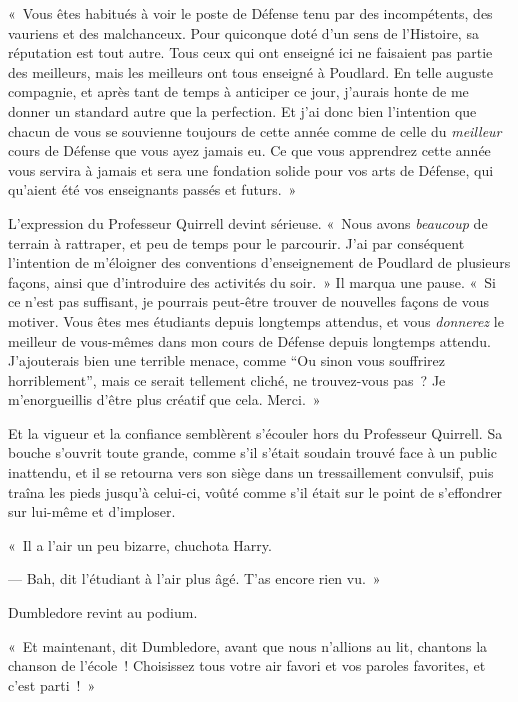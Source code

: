 «~Vous êtes habitués à voir le poste de Défense tenu par des incompétents, des vauriens et des malchanceux. Pour quiconque doté d'un sens de l'Histoire, sa réputation est tout autre. Tous ceux qui ont enseigné ici ne faisaient pas partie des meilleurs, mais les meilleurs ont tous enseigné à Poudlard. En telle auguste compagnie, et après tant de temps à anticiper ce jour, j'aurais honte de me donner un standard autre que la perfection. Et j'ai donc bien l'intention que chacun de vous se souvienne toujours de cette année comme de celle du \emph{meilleur} cours de Défense que vous ayez jamais eu. Ce que vous apprendrez cette année vous servira à jamais et sera une fondation solide pour vos arts de Défense, qui qu'aient été vos enseignants passés et futurs.~»

L'expression du Professeur Quirrell devint sérieuse. «~Nous avons \emph{beaucoup} de terrain à rattraper, et peu de temps pour le parcourir. J'ai par conséquent l'intention de m'éloigner des conventions d'enseignement de Poudlard de plusieurs façons, ainsi que d'introduire des activités du soir.~» Il marqua une pause. «~Si ce n'est pas suffisant, je pourrais peut-être trouver de nouvelles façons de vous motiver. Vous êtes mes étudiants depuis longtemps attendus, et vous \emph{donnerez} le meilleur de vous-mêmes dans mon cours de Défense depuis longtemps attendu. J'ajouterais bien une terrible menace, comme “Ou sinon vous souffrirez horriblement”, mais ce serait tellement cliché, ne trouvez-vous pas~? Je m'enorgueillis d'être plus créatif que cela. Merci.~»

Et la vigueur et la confiance semblèrent s'écouler hors du Professeur Quirrell. Sa bouche s'ouvrit toute grande, comme s'il s'était soudain trouvé face à un public inattendu, et il se retourna vers son siège dans un tressaillement convulsif, puis traîna les pieds jusqu'à celui-ci, voûté comme s'il était sur le point de s'effondrer sur lui-même et d'imploser.

«~Il a l'air un peu bizarre, chuchota Harry.

--- Bah, dit l'étudiant à l'air plus âgé. T'as encore rien vu.~»

Dumbledore revint au podium.

«~Et maintenant, dit Dumbledore, avant que nous n'allions au lit, chantons la chanson de l'école~! Choisissez tous votre air favori et vos paroles favorites, et c'est parti~!~»

